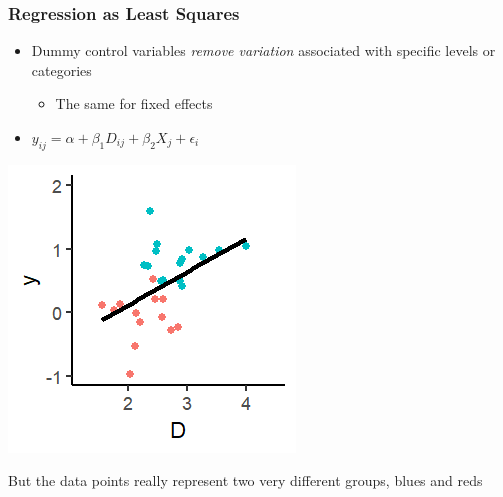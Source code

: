 \documentclass[xcolor=x11names,compress]{beamer}\usepackage[]{graphicx}\usepackage[]{color}
\makeatletter
\def\maxwidth{ %
  \ifdim\Gin@nat@width>\linewidth
    \linewidth
  \else
    \Gin@nat@width
  \fi
}
\newenvironment{knitrout}{}{} %
\renewcommand{\(}{\begin{columns}}
\renewcommand{\)}{\end{columns}}
\newcommand{\<}[1]{\begin{column}{#1}}
\renewcommand{\>}{\end{column}}
\makeatother
\begin{document}
\begin{frame}
\frametitle{Regression as Least Squares}
\begin{itemize}
\item Dummy control variables \textit{remove variation} associated with specific levels or categories
\begin{itemize}
\item The same for fixed effects
\end{itemize}
\item $y_{ij} = \alpha + \beta_1 D_{ij} + \beta_2 X_j + \epsilon_i$
\end{itemize}
\begin{multicols}{2}
\begin{knitrout}
\color{fgcolor}
\includegraphics[width=\maxwidth]{figure/graph_ols_FE2-1} 

\end{knitrout}
\columnbreak
But the data points really represent two very different groups, blues and reds
\end{multicols}
\end{frame}
\end{document}
